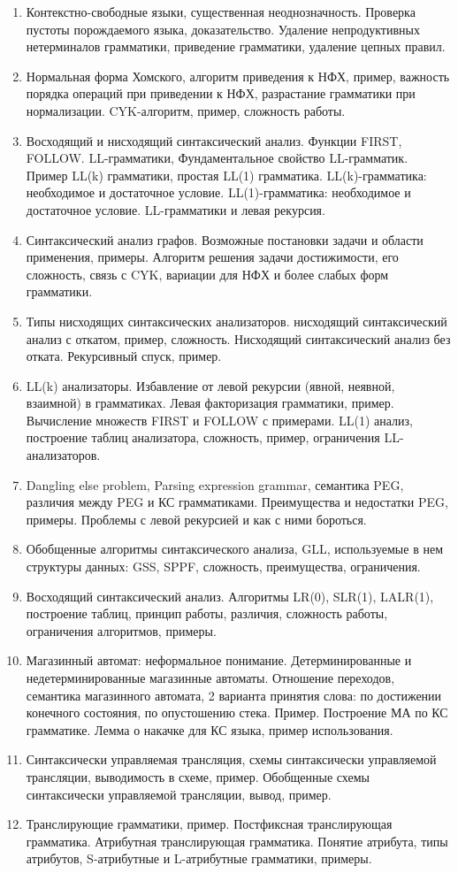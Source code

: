 \documentclass[12pt]{article}
\newcommand{\litem}[1]{\item #1 }%
\begin{document}
\begin{enumerate}
  \litem {Контекстно-свободные языки, существенная неоднозначность. Проверка пустоты порождаемого языка, доказательство. Удаление непродуктивных нетерминалов грамматики, приведение грамматики, удаление цепных правил. }
  \litem {Нормальная форма Хомского, алгоритм приведения к НФХ, пример, важность порядка операций при приведении к НФХ, разрастание грамматики при нормализации. CYK-алгоритм, пример, сложность работы. }
  \litem {Восходящий и нисходящий синтаксический анализ. Функции FIRST, FOLLOW. LL-грамматики, Фундаментальное свойство LL-грамматик. Пример LL(k) грамматики, простая LL(1) грамматика. LL(k)-грамматика: необходимое и достаточное условие. LL(1)-грамматика: необходимое и достаточное условие. LL-грамматики и левая рекурсия.}
  \litem {Синтаксический анализ графов. Возможные постановки задачи и области применения, примеры. Алгоритм решения задачи достижимости, его сложность, связь с CYK, вариации для НФХ и более слабых форм грамматики. }
  \litem {Типы нисходящих синтаксических анализаторов. нисходящий синтаксический анализ с откатом, пример, сложность. Нисходящий синтаксический анализ без отката. Рекурсивный спуск, пример. }
  \litem {LL(k) анализаторы. Избавление от левой рекурсии (явной, неявной, взаимной) в грамматиках. Левая факторизация грамматики, пример. Вычисление множеств FIRST и FOLLOW с примерами. LL(1) анализ, построение таблиц анализатора, сложность, пример, ограничения LL-анализаторов. }
  \litem {Dangling else problem, Parsing expression grammar, семантика PEG, различия между PEG и КС грамматиками. Преимущества и недостатки PEG, примеры. Проблемы с левой рекурсией и как с ними бороться. }
  \litem {Обобщенные алгоритмы синтаксического анализа, GLL, используемые в нем структуры данных: GSS, SPPF, сложность, преимущества, ограничения.}
  \litem {Восходящий синтаксический анализ. Алгоритмы LR(0), SLR(1), LALR(1), построение таблиц, принцип работы, различия, сложность работы, ограничения алгоритмов, примеры.}
  \litem {Магазинный автомат: неформальное понимание. Детерминированные и недетерминированные магазинные автоматы. Отношение переходов, семантика магазинного автомата, 2 варианта принятия слова: по достижении конечного состояния, по опустошению стека. Пример. Построение МА по КС грамматике. Лемма о накачке для КС языка, пример использования. }
  \litem {Синтаксически управляемая трансляция, схемы синтаксически управляемой трансляции, выводимость в схеме, пример. Обобщенные схемы синтаксически управляемой трансляции, вывод, пример. }
  \litem {Транслирующие грамматики, пример. Постфиксная транслирующая грамматика. Атрибутная транслирующая грамматика. Понятие атрибута, типы атрибутов, S-атрибутные и L-атрибутные грамматики, примеры. }

\end{enumerate}
\end{document}
